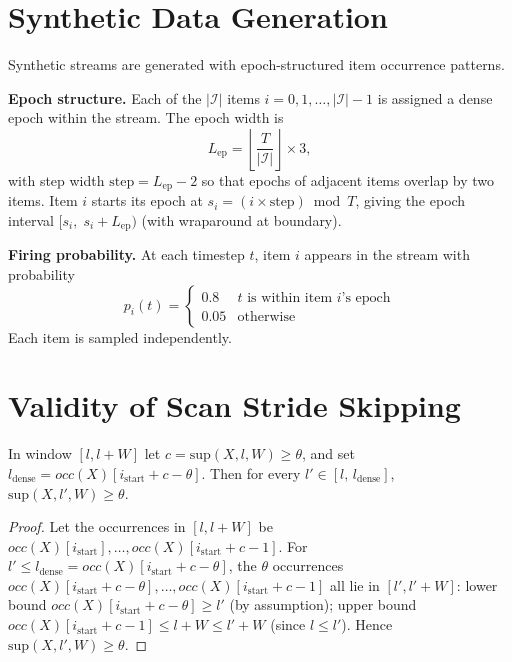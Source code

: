 \appendix

\section{Synthetic Data Generation}

Synthetic streams are generated with epoch-structured item occurrence patterns.

\textbf{Epoch structure.}
Each of the $|\mathcal{I}|$ items $i = 0, 1, \ldots, |\mathcal{I}|{-}1$
is assigned a dense epoch within the stream.
The epoch width is
\[
  L_{\mathrm{ep}} = \left\lfloor \frac{T}{|\mathcal{I}|} \right\rfloor \times 3,
\]
with step width $\mathrm{step} = L_{\mathrm{ep}} - 2$ so that epochs of
adjacent items overlap by two items.
Item $i$ starts its epoch at $s_i = (i \times \mathrm{step}) \bmod T$,
giving the epoch interval $[s_i,\; s_i + L_{\mathrm{ep}})$
(with wraparound at boundary).

\textbf{Firing probability.}
At each timestep $t$, item $i$ appears in the stream with probability
\[
  p_i(t) =
  \begin{cases}
    0.8  & t \text{ is within item } i\text{'s epoch} \\
    0.05 & \text{otherwise}
  \end{cases}
\]
Each item is sampled independently.

\section{Validity of Scan Stride Skipping}

\begin{lemma}\label{lem:stride_dense}
In window $[l, l+W]$ let $c = \mathrm{sup}(X, l, W) \geq \theta$,
and set $l_{\mathrm{dense}} = \mathit{occ}(X)[i_{\mathrm{start}} + c - \theta]$.
Then for every $l' \in [l,\, l_{\mathrm{dense}}]$,
$\mathrm{sup}(X, l', W) \geq \theta$.
\end{lemma}

\begin{proof}
Let the occurrences in $[l, l+W]$ be
$\mathit{occ}(X)[i_{\mathrm{start}}], \ldots, \mathit{occ}(X)[i_{\mathrm{start}}+c-1]$.
For $l' \leq l_{\mathrm{dense}} = \mathit{occ}(X)[i_{\mathrm{start}}+c-\theta]$,
the $\theta$ occurrences
$\mathit{occ}(X)[i_{\mathrm{start}}+c-\theta], \ldots, \mathit{occ}(X)[i_{\mathrm{start}}+c-1]$
all lie in $[l', l'+W]$:
lower bound $\mathit{occ}(X)[i_{\mathrm{start}}+c-\theta] \geq l'$ (by assumption);
upper bound $\mathit{occ}(X)[i_{\mathrm{start}}+c-1] \leq l+W \leq l'+W$ (since $l \leq l'$).
Hence $\mathrm{sup}(X, l', W) \geq \theta$.
\end{proof}

